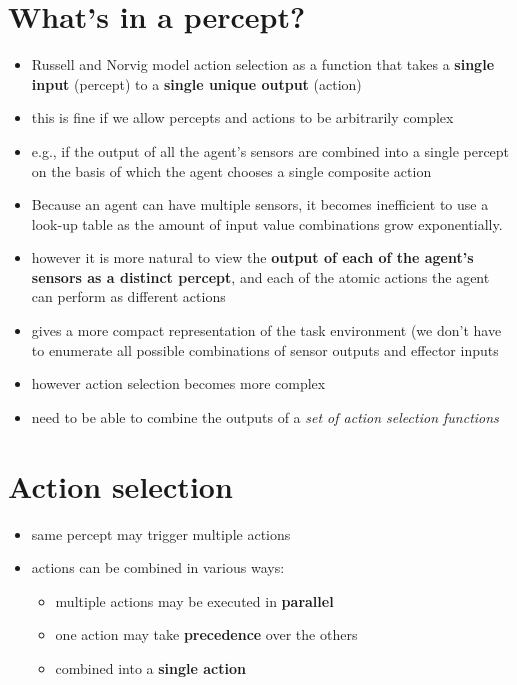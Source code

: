 \documentclass{article}
\begin{document}
\section{What's in a percept?}

\begin{itemize}
  \item Russell and Norvig model action selection as a function that takes a \textbf{single input} (percept) to a \textbf{single unique output} (action) 
  \item this is fine if we allow percepts and actions to be arbitrarily complex 
  \item e.g., if the output of all the agent’s sensors are combined into a single percept on the basis of which the agent chooses a single composite action
  \item Because an agent can have multiple sensors, it becomes inefficient to use a look-up table as the amount of input value combinations grow exponentially.
  \item however it is more natural to view the \textbf{output of each of the agent’s sensors as a distinct percept}, and each of the atomic actions the agent can perform as different actions 
  \item gives a more compact representation of the task environment (we don’t have to enumerate all possible combinations of sensor outputs and effector inputs
  \item however action selection becomes more complex
  \item need to be able to combine the outputs of a \textit{set of action selection functions}
\end{itemize}

\section{Action selection}
\begin{itemize}
  \item same percept may trigger multiple actions 
  \item actions can be combined in various ways:
  \begin{itemize}
    \item multiple actions may be executed in \textbf{parallel}
    \item one action may take \textbf{precedence} over the others
    \item combined into a \textbf{single action}
  \end{itemize}
\end{itemize}
\end{document}
